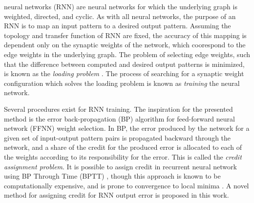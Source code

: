 \documentclass[journal]{IEEEtran}
\begin{document}
 neural networks (RNN) are neural networks for which the underlying graph is weighted, directed, and cyclic. As with all neural networks, the purpose of an RNN is to map an input pattern to a desired output pattern. Assuming the topology and transfer function of RNN are fixed, the accuracy of this mapping is dependent only on the synaptic weights of the network, which coorespond to the edge weights in the underlying graph. The problem of selecting edge weights, such that the difference between computed and desired output patterns is minimized, is known as the \emph{loading problem} \cite{loading_problem_for_recurrent_neural_networks_Gori2005}. The process of searching for a synaptic weight configuration which solves the loading problem is known as \emph{training} the neural network.

Several procedures exist for RNN training. The inspiration for the presented method is the error back-propagation (BP) algorithm for feed-forward neural network (FFNN) weight selection. In BP, the error produced by the network for a given set of input-output pattern pairs is propagated backward through the network, and a share of the credit for the produced error is allocated to each of the weights according to its responsibility for the error. This is called the \textit{credit assignment problem}. It is possible to assign credit in recurrent neural network using BP Through Time (BPTT) \cite{generalization_of_backpropagation_with_application_to_recurrent_gas_market_model_Werbos1988, focused_backpropagation_algorithm_for_temporal_pattern_recognition_Mozer89}, though this approach is known to be computationally expensive, and is prone to convergence to local minima \cite{rnn_are_local_minima_prone_Cuallar2006}. A novel method for assigning credit for RNN output error is proposed in this work.
\end{document}
